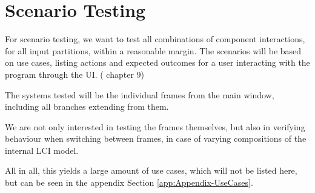 \section{Scenario Testing} \label{sec:Testing-ScenarioTesting}

For scenario testing, we want to test all combinations of component interactions, for all input partitions, within a reasonable margin. The scenarios will be based on use cases, listing actions and expected outcomes for a user interacting with the program through the UI. (\cite{UML} chapter 9)

The systems tested will be the individual frames from the main window, including all branches extending from them. 

We are not only interested in testing the frames themselves, but also in verifying behaviour when switching between frames, in case of varying compositions of the internal LCI model. 

All in all, this yields a large amount of use cases, which will not be listed here, but can be seen in the appendix Section \ref{app:Appendix-UseCases}.